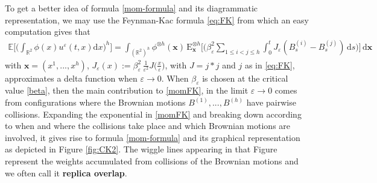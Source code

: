 \documentclass[a4paper,reqno,11pt]{amsart}
\numberwithin{equation}{section}
\theoremstyle{mytheorem}
\newcommand{\bbE}{{\ensuremath{\mathbb E}} }
\newcommand{\R}{\mathbb{R}}
\def\bs{\boldsymbol}
\newcommand\bE{\ensuremath{\bs{\mathrm{E}}}}
\renewcommand{\epsilon}{\varepsilon}
\newcommand\dd{\mathrm{d}}
\newcommand\bx{\boldsymbol{x}}
\begin{document}
{To get a better idea of formula  \eqref{mom-formula} and its diagrammatic representation,   
we may use the Feynman-Kac formula \eqref{eq:FK} from which an easy computation
gives that
\begin{align}\label{momFK}
\bbE\Big[\Big( \int_{\R^2} \phi(x) u^\epsilon(t,x) \dd x \Big)^h \Big]
=\int_{(\R^2)^h} \phi^{\otimes h}(\bx) \, \bE_{\bx}^{\otimes h} \Big[ \Big( \beta_\epsilon^2 \sum_{1\leq i<j\leq h} \int_0^t J_\epsilon(B_s^{(i)} -B_s^{(j)})  \,\dd s\Big) \Big] \,\dd \bx
\end{align}
with $\bx=(x^1,...,x^h)$, $J_\epsilon(x):=\beta_\epsilon^2 \,\frac{1}{\epsilon^2} J\big(\frac{x}{\epsilon}\big)$,
with $J=j*j$ and $j$ as in \eqref{eq:FK}, 
approximates a delta function when $\epsilon\to0$. When $\beta_\epsilon$ is chosen
at the critical value \eqref{beta}, then the main contribution to \eqref{momFK}, in the limit $\epsilon\to0$
comes from configurations where the Brownian motions $B^{(1)},...,B^{(h)}$ have pairwise collisions. 
Expanding the exponential in \eqref{momFK} and breaking down according to when and where the collisions take place 
and which Brownian motions are involved, it gives rise to  formula \eqref{mom-formula} 
and its graphical representation as depicted in Figure \ref{fig:CK2}.  The wiggle lines appearing in that
Figure represent the weights accumulated from collisions of the Brownian motions and we often call it
{\bf replica overlap}.

\begin{figure}
\end{figure}}
\end{document}
